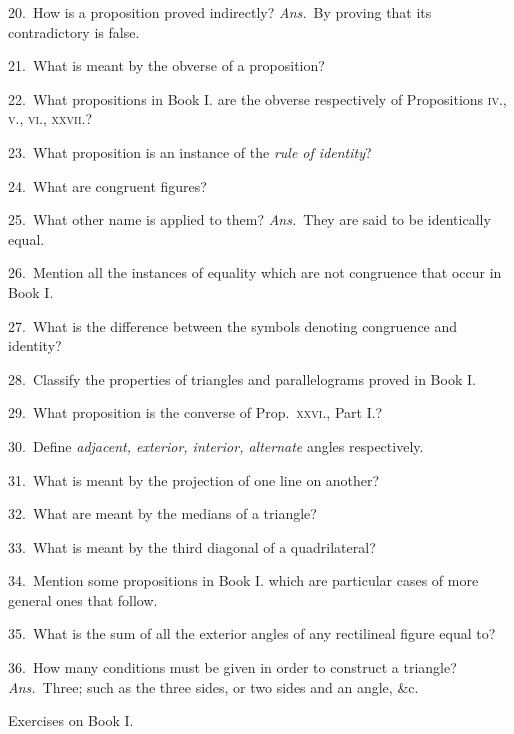 \documentclass[oneside]{book}
\newcommand\exhead[1]{
\Needspace*{5\baselineskip}\begin{center}
\textsf{#1}
\end{center}
}
\begin{document}
\begin{footnotesize}
20.~How is a proposition proved indirectly? \textit{Ans.}\ By proving
that its contradictory is false.

21.~What is meant by the obverse of a proposition?

22.~What propositions in Book I. are the obverse respectively
of Propositions \textsc{iv., v., vi., xxvii.}?

23.~What proposition is an instance of the \textit{rule of identity}?

24.~What are congruent figures?

25.~What other name is applied to them? \textit{Ans.}\ They are
said to be identically equal.

26.~Mention all the instances of equality which are not
congruence that occur in Book I.

27.~What is the difference between the symbols denoting
congruence and identity?

28.~Classify the properties of triangles and parallelograms
proved in Book I.

29.~What proposition is the converse of Prop.\ \textsc{xxvi.}, Part I.?

30.~Define \textit{adjacent, exterior, interior, alternate} angles
respectively.

31.~What is meant by the projection of one line on another?

32.~What are meant by the medians of a triangle?

33.~What is meant by the third diagonal of a quadrilateral?

34.~Mention some propositions in Book I. which are particular
cases of more general ones that follow.

35.~What is the sum of all the exterior angles of any
rectilineal figure equal to?

36.~How many conditions must be given in order to construct
a triangle? \textit{Ans.}\ Three; such as the three sides, or two sides
and an angle, \&c.
\par\end{footnotesize}

\exhead{Exercises on Book I.}
\end{document}
